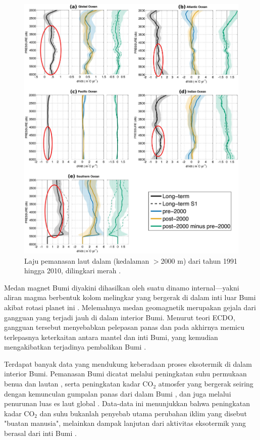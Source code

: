 \documentclass[10pt,twocolumn,letterpaper]{article}
\begin{document}
\begin{figure}[t]
\begin{center}
   \includegraphics[width=1\linewidth]{ocean-highlight.jpg}
\end{center}
   \caption{Laju pemanasan laut dalam (kedalaman $>$2000 m) dari tahun 1991 hingga 2010, dilingkari merah \cite{132}.}
\label{fig:15}
\label{fig:onecol}
\end{figure}

Medan magnet Bumi diyakini dihasilkan oleh suatu dinamo internal—yakni aliran magma berbentuk kolom melingkar yang bergerak di dalam inti luar Bumi akibat rotasi planet ini \cite{123}. Melemahnya medan geomagnetik merupakan gejala dari gangguan yang terjadi jauh di dalam interior Bumi. Menurut teori ECDO, gangguan tersebut menyebabkan pelepasan panas dan pada akhirnya memicu terlepasnya keterkaitan antara mantel dan inti Bumi, yang kemudian mengakibatkan terjadinya pembalikan Bumi \cite{1}.

Terdapat banyak data yang mendukung keberadaan proses eksotermik di dalam interior Bumi. Pemanasan Bumi dicatat melalui peningkatan suhu permukaan benua dan lautan \cite{127,128}, serta peningkatan kadar CO$_2$ atmosfer yang bergerak seiring dengan kemunculan gumpalan panas dari dalam Bumi \cite{129,130}, dan juga melalui penurunan luas es laut global \cite{131}. Data-data ini menunjukkan bahwa peningkatan kadar CO$_2$ dan suhu bukanlah penyebab utama perubahan iklim yang disebut "buatan manusia", melainkan dampak lanjutan dari aktivitas eksotermik yang berasal dari inti Bumi \cite{129}.
\end{document}
